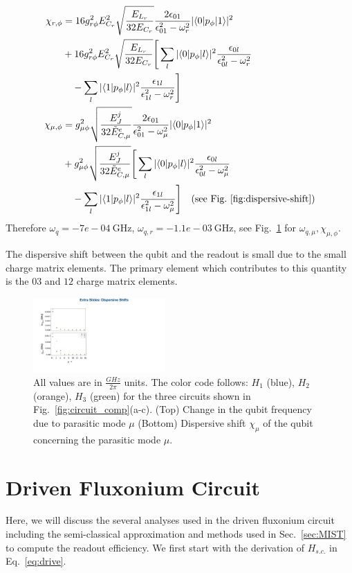 \documentclass[%
reprint,
superscriptaddress,
 amsmath,amssymb,
 aps,
 prx,
longbibliography,
floatfix,
]{revtex4-2}
\begin{document}
{\begin{align}
\chi_{r,\phi}&=16g_{r\phi}^2E_{C_r}^2\sqrt{\frac{E_{L_r}}{32E_{C_r}}}\frac{2\epsilon_{01}}{\epsilon_{01}^2-\omega_r^2}|\langle 0|p_\phi|1 \rangle|^2\nonumber\\
   &+16g_{r\phi}^2E_{C_r}^2\sqrt{\frac{E_{L_r}}{32E_{C_r}}}\Bigg[\sum_l|\langle 0|p_\phi|l \rangle|^2\frac{\epsilon_{0l}}{\epsilon_{0l}^2-\omega_r^2}\nonumber\\&\quad-\sum_l|\langle 1|p_\phi|l \rangle|^2\frac{\epsilon_{1l}}{\epsilon_{1l}^2-\omega_r^2}\Bigg] \\
   \chi_{\mu,\phi}&=g_{\mu\phi}^2\sqrt{\frac{E_J^j}{32\tilde{E}_{C,\mu}^e}}\frac{2\epsilon_{01}}{\epsilon_{01}^2-\omega_\mu^2}|\langle 0|p_\phi|1 \rangle|^2\nonumber\\
   &+g_{\mu\phi}^2\sqrt{\frac{E_J^j}{32\tilde{E}_{C,\mu}^e}}\Bigg[\sum_l|\langle 0|p_\phi|l \rangle|^2\frac{\epsilon_{0l}}{\epsilon_{0l}^2-\omega_\mu^2}\nonumber\\&\quad-\sum_l|\langle 1|p_\phi|l \rangle|^2\frac{\epsilon_{1l}}{\epsilon_{1l}^2-\omega_\mu^2}\Bigg]
   \quad\text{(see Fig.~\ref{fig:dispersive-shift})}
\end{align}
}
Therefore $\omega_q=-7e-04 \ \mathrm{GHz}$, $\omega_{q,r}=-1.1e-03 \ \mathrm{GHz}$, see Fig.~\ref{fig:dispersive-shift} for $\omega_{q,\mu},\chi_{\mu,\phi}$.
   
The dispersive shift between the qubit and the readout is small due to the small charge matrix elements. The primary element which contributes to this quantity is the $03$ and $12$ charge matrix elements. 
\begin{figure}[htb]
    \centering
    \includegraphics[width=0.45\textwidth]{Figures/dispersive-shift.pdf}
    \caption{All values are in $\frac{GHz}{2\pi}$ units. The color code follows: $H_1$ (blue), $H_2$ (orange), $H_3$ (green) for the three circuits shown in Fig.~\ref{fig:circuit_comp}(a-c). (Top) Change in the qubit frequency due to parasitic mode $\mu$ (Bottom) Dispersive shift $\chi_\mu$ of the qubit concerning the parasitic mode $\mu$.}
    \label{fig:dispersive-shift}
\end{figure}
\section{Driven Fluxonium Circuit}\label{app:MIST}
Here, we will discuss the several analyses used in the driven fluxonium circuit including the semi-classical approximation and methods used in Sec.~\ref{sec:MIST} to compute the readout efficiency. We first start with the derivation of $H_{s.c.}$ in Eq.~\ref{eq:drive}.
\end{document}
